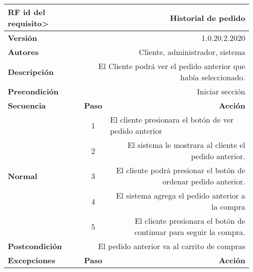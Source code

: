 \documentclass[conference]{IEEEtran}
\begin{document}
\begin{table}[H]
  \centering
  \begin{adjustbox}{width=0.47\textwidth}
    \begin{tabular}{|p{11.215em}|r|r|}
    \toprule
    \textbf{RF id del requisito>} & \multicolumn{2}{p{37.355em}|}{\textbf{Historial de pedido}} \\
    \midrule
    \textbf{Versión} & \multicolumn{2}{p{37.355em}|}{1.0.20.2.2020} \\
    \midrule
    \textbf{Autores} & \multicolumn{2}{p{37.355em}|}{Cliente, administrador, sistema} \\
    \midrule
    \textbf{Descripción} & \multicolumn{2}{p{37.355em}|}{El Cliente podrá ver el pedido anterior que había seleccionado. } \\
    \midrule
    \textbf{Precondición} & \multicolumn{2}{p{37.355em}|}{Iniciar sección} \\
    \midrule
    \textbf{Secuencia} & \multicolumn{1}{p{5.355em}|}{\textbf{Paso}} & \multicolumn{1}{p{32em}|}{\textbf{Acción}} \\
    \midrule
    \multirow{6}[10]{*}{\textbf{Normal}} & \multicolumn{1}{c|}{\multirow{2}[2]{*}{1}} & \multicolumn{1}{l|}{\multirow{2}[2]{*}{El cliente presionara el botón de ver pedido anterior }} \\
    \multicolumn{1}{|c|}{} &       &  \\
\cmidrule{2-3}    \multicolumn{1}{|c|}{} & \multicolumn{1}{c|}{2} & \multicolumn{1}{p{32em}|}{El sistema le mostrara al cliente el pedido anterior.} \\
\cmidrule{2-3}    \multicolumn{1}{|c|}{} & \multicolumn{1}{c|}{3} & \multicolumn{1}{p{32em}|}{El cliente podrá presionar el botón de ordenar pedido anterior.} \\
\cmidrule{2-3}    \multicolumn{1}{|c|}{} & \multicolumn{1}{c|}{4} & \multicolumn{1}{p{32em}|}{El sistema agrega el pedido anterior a la compra} \\
\cmidrule{2-3}    \multicolumn{1}{|c|}{} & \multicolumn{1}{c|}{5} & \multicolumn{1}{p{32em}|}{El cliente presionara el botón de continuar para seguir la compra.} \\
    \midrule
    \textbf{Postcondición} & \multicolumn{2}{p{37.355em}|}{El pedido anterior va al carrito de compras} \\
    \midrule
    \multirow{3}[4]{*}{\textbf{Excepciones}} & \multicolumn{1}{p{5.355em}|}{\textbf{Paso}} & \multicolumn{1}{p{32em}|}{\textbf{Acción}} \\

\end{tabular}
\end{adjustbox}
\end{table}
\end{document}
